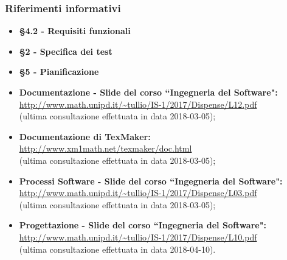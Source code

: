 	    \subsubsection{Riferimenti informativi}

		    \begin{itemize}
				\item
                \textbf{\vAnalisiDeiRequisiti{} §4.2 - Requisiti funzionali}\\
                
                \item
                \textbf{\vPianoDiQualifica{} §2 - Specifica dei test}\\

				\item
                \textbf{\vPianoDiProgetto{} §5 - Pianificazione}\\

                \item
                \textbf{Documentazione - Slide del corso ``Ingegneria del Software":}\\
                \url{http://www.math.unipd.it/~tullio/IS-1/2017/Dispense/L12.pdf} \\
                (ultima consultazione effettuata in data 2018-03-05);

                \item
                \textbf{Documentazione di TexMaker:}\\
                \url{http://www.xm1math.net/texmaker/doc.html} \\
                (ultima consultazione effettuata in data 2018-03-05);

                \item
                \textbf{Processi Software - Slide del corso ``Ingegneria del Software":}\\
                \url{http://www.math.unipd.it/~tullio/IS-1/2017/Dispense/L03.pdf} \\
                (ultima consultazione effettuata in data 2018-03-05);
                
                \item
                \textbf{Progettazione - Slide del corso ``Ingegneria del Software":}\\
                \url{http://www.math.unipd.it/~tullio/IS-1/2017/Dispense/L10.pdf} \\
                (ultima consultazione effettuata in data 2018-04-10).
                

\end{itemize}
